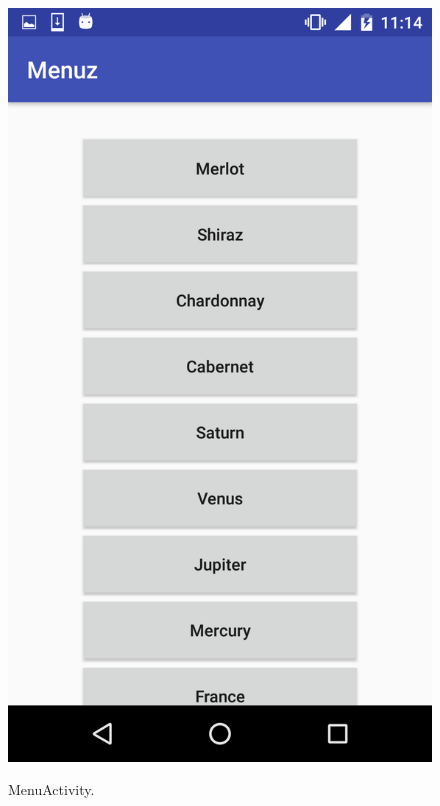 \begin{figure}[!ht]
  \begin{center}
    \includegraphics[scale=0.22]{img/menu.png}
    \label{fig:menu}
    \caption{MenuActivity.}
  \end{center}
\end{figure}

\newpage

